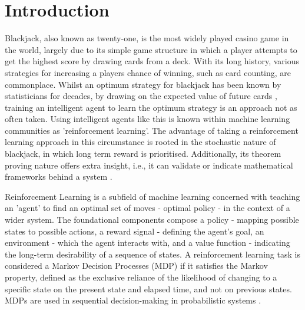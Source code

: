 \section{Introduction}

Blackjack, also known as twenty-one, is the most widely played casino game in the world, largely due to its simple game structure in which a player attempts to get the highest score by drawing cards from a deck. With its long history, various strategies for increasing a players chance of winning, such as card counting, are commonplace. Whilst an optimum strategy for blackjack has been known by statisticians for decades, by drawing on the expected value of future cards \cite{Baldwin01091956}, training an intelligent agent to learn the optimum strategy is an approach not as often taken. Using intelligent agents like this is known within machine learning communities as 'reinforcement learning'. The advantage of taking a reinforcement learning approach in this circumstance is rooted in the stochastic nature of blackjack, in which long term reward is prioritised. Additionally, its theorem proving nature offers extra insight, i.e., it can validate or indicate mathematical frameworks behind a system \cite{bidi2023reinforcementlearningcontroltheory}. 

\medskip
Reinforcement Learning is a subfield of machine learning concerned with teaching an 'agent' to find an optimal set of moves - optimal policy - in the context of a wider system. The foundational components compose a policy - mapping possible states to possible actions, a reward signal - defining the agent's goal, an environment - which the agent interacts with, and a value function - indicating the long-term desirability of a sequence of states. A reinforcement learning task is considered a Markov Decision Processes (MDP) if it satisfies the Markov property, defined as the exclusive reliance of the likelihood of changing to a specific state on the present state and elapsed time, and not on previous states. MDPs are used in sequential decision-making in probabilistic systems \cite{10.5555/3312046}.


